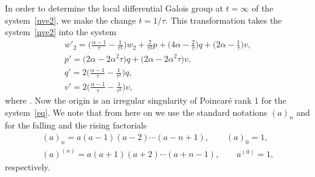 \documentclass[pdftex]{sigma}
\numberwithin{equation}{section}
\begin{document}
 In order to determine the local differential Galois group at $t=\infty$ of the system~\eqref{nve2}, we make the
 change $t=1/\tau$. This transformation takes the system~\eqref{nve2} into the system
 \begin{gather}
 w'_2 =
 \biggl(\frac{\alpha-1}{\tau} - \frac{1}{\tau^2}\biggr) w_2 + \frac{2}{\tau^2} p
 + \biggl(4 \alpha -\frac{2}{\tau}\biggr) q + \biggl(2 \alpha - \frac{1}{\tau}\biggr) v,\nonumber\\
 p' =
 \bigl(2 \alpha - 2 \alpha^2 \tau\bigr) q + \bigl(2 \alpha - 2 \alpha^2 \tau\bigr) v,\nonumber\\
 q' =
 2 \biggl(\frac{\alpha-1}{\tau} - \frac{1}{\tau^2}\biggr) q,\nonumber\\
 v' =
 2 \biggl(\frac{\alpha-1}{\tau} - \frac{1}{\tau^2}\biggr) v ,\label{eq}
 \end{gather}
 where . Now the origin is an irregular singularity of Poincar\'{e} rank 1 for the system~\eqref{eq}.
 We note that from here on we use the standard notations $(a)_n$ and  for the falling and the rising factorials
 \begin{gather*}
 (a)_n=a (a-1) (a-2) \cdots (a-n+1), \qquad (a)_0=1,\\
 (a)^{(n)}=a (a+1) (a+2) \cdots (a+n-1), \qquad a^{(0)}=1,
 \end{gather*}
 respectively.
\end{document}
